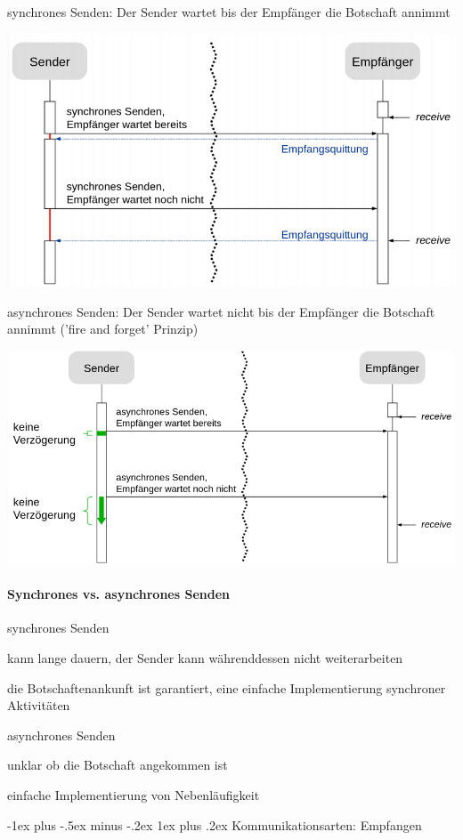 \documentclass[10pt]{article}
\makeatletter
\renewcommand{\subsubsection}{\@startsection{subsubsection}{3}{0mm}%
                                {-1ex plus -.5ex minus -.2ex}%
                                {1ex plus .2ex}%
                                {\normalfont\small\bfseries}}
\makeatother
\begin{document}
  \color{orange} synchrones Senden: \color{black} Der Sender wartet bis der Empfänger die Botschaft annimmt
  \begin{center}
    \includegraphics[width=0.4\linewidth]{Assets/Programmierparadigmen-synchrones-senden}
  \end{center}
  \noindent \color{orange} asynchrones Senden: \color{black} Der Sender wartet nicht bis der Empfänger die Botschaft annimmt ('fire and forget' Prinzip)
  \begin{center}
    \includegraphics[width=0.4\linewidth]{Assets/Programmierparadigmen-asynchrones-senden}
  \end{center}
  
  \paragraph{Synchrones vs. asynchrones Senden}
  
  \begin{itemize*}
    \item synchrones Senden
    \begin{itemize*}
      \item kann lange dauern, der Sender kann währenddessen nicht weiterarbeiten
      \item die Botschaftenankunft ist garantiert, eine einfache Implementierung synchroner Aktivitäten
    \end{itemize*}
    \item asynchrones Senden
    \begin{itemize*}
      \item unklar ob die Botschaft angekommen ist
      \item einfache Implementierung von Nebenläufigkeit
    \end{itemize*}
  \end{itemize*}
  
  \subsubsection{Kommunikationsarten: Empfangen}
  
\end{document}
